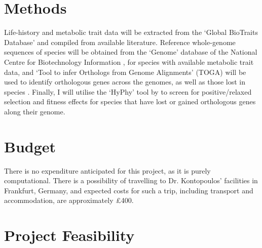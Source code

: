\documentclass[11pt]{article}
\begin{document}
\section{Methods}
Life-history and metabolic trait data will be extracted from the `Global BioTraits Database' \citep{Dell2013Environmental} and compiled from available literature. Reference whole-genome sequences of species will be obtained from the `Genome' database of the National Centre for Biotechnology Information \citep{ncbi2022}, for species with available metabolic trait data, and `Tool to infer Orthologs from Genome Alignments' (TOGA) will be used to identify orthologous genes across the genomes, as well as those lost in species \citep{Bogdan2023Integrating}. Finally, I will utilise the `HyPhy' tool by \cite{Kosakovsky2020HYpothesis} to screen for positive/relaxed selection and fitness effects for species that have lost or gained orthologous genes along their genome.

\section{Budget}
There is no expenditure anticipated for this project, as it is purely computational. There is a possibility of travelling to Dr. Kontopoulos' facilities in Frankfurt, Germany, and expected costs for such a trip, including transport and accommodation, are approximately £400.

\section{Project Feasibility}
\begin{gantt}{7}{10}
    \begin{ganttitle}
    \end{ganttitle}
    \begin{ganttitle}

    \end{ganttitle}

  \end{gantt}
\pagebreak


\end{document}
